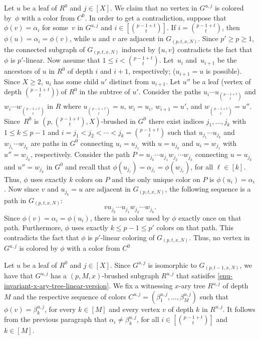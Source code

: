 \documentclass[11pt]{article}
\begin{document}
Let $u$ be a leaf of $R^0$ and $j\in [X]$.  We claim that no vertex in
$G^{u,j}$ is colored by~$\phi$ with a color from $C^0$. In order to get a
contradiction, suppose that $\phi(v) =\alpha_i$ for some~$v$ in $G^{u,j}$ and
$i\in\left[\binom{p-1+t}{t}\right]$.  If $i=\binom{p-1+t}{t}$, then
$\phi(u) = \alpha_i = \phi(v)$, while $u$ and $v$ are adjacent in
$G_{(p,t,x,N)}$.  Since $p'\geq p\geq1$, the connected subgraph of
$G_{(p,t,x,N)}$ induced by $\{u,v\}$ contradicts the fact that $\phi$ is
$p'$-linear.  Now assume that $1\leq i< \binom{p-1+t}{t}$.  Let~$u_i$
and~$u_{i+1}$ be the ancestors of $u$ in $R^0$ of depth $i$ and $i+1$,
respectively; ($u_{i+1} = u$ is possible).  Since $X\geq2$, $u_i$ has some
child $u'$ distinct from $u_{i+1}$.  Let $u''$ be a leaf (vertex of depth
$\binom{p-1+t}{t}$) of $R^0$ in the subtree of $u'$.  Consider the paths
$u_i \cdots u_{\binom{p-1+t}{t}}$ and $w_i \cdots w_{\binom{p-1+t}{t}}$ in
$R$ where $u_{\binom{p-1+t}{t}}=u$, $w_i=u_i$, $w_{i+1}=u'$, and
$w_{\binom{p-1+t}{t}}=u''$.  Since~$R^0$ is
$\left(p,\binom{p-1+t}{t},X\right)$-brushed in $G^0$ there exist indices
$j_1,\ldots,j_k$ with $1\leq k \leq p-1$ and
$i=j_1 < j_2 < \cdots < j_k=\binom{p-1+t}{t}$ such that
$u_{j_1}\cdots u_{j_k}$ and $w_{j_1}\cdots w_{j_k}$ are paths in $G^0$
connecting $u_i = u_{j_1}$ with $u = u_{j_k}$ and $u_i = w_{j_1}$ with
$u'' = w_{j_k}$, respectively.  Consider the path
$P = u_{j_k} \cdots u_{j_1} w_{j_2} \cdots w_{j_k}$ connecting $u=u_{j_k}$ and
$u''=w_{j_k}$ in $G^0$ and recall that
$\phi(u_{j_{\ell}}) = \alpha_{j_{\ell}} =\phi(w_{j_{\ell}})$, for all
$\ell\in[k]$.  Thus, $\phi$ uses exactly $k$ colors on $P$ and the only unique
color on $P$ is $\phi(u_i) = \alpha_i$.  Now since $v$ and $u_{j_k}=u$ are
adjacent in $G_{(p,t,x,N)}$, the following sequence is a path in
$G_{(p,t,x,N)}$:
\[
v u_{j_k} \cdots u_{j_1} w_{j_2} \cdots w_{j_k}.
\]
Since $\phi(v) =\alpha_i = \phi(u_i)$, there is no color used by $\phi$ exactly once on that path. 
Furthermore, $\phi$ uses exactly $k \leq p-1 \leq p'$ colors on that path. 
This contradicts the fact that $\phi$ is $p'$-linear coloring of $G_{(p,t,x,N)}$.
Thus, no vertex in $G^{u,j}$ is colored by $\phi$ with a color from $C^0$

Let $u$ be a leaf of $R^0$ and $j\in [X]$. 
Since $G^{u,j}$ is isomorphic to $G_{(p,t-1,x,N)}$, we have that
$G^{u,j}$ has a $\left(p,M,x\right)$-brushed subgraph $R^{u,j}$ that satisifes \eqref{enu-invariant-x-ary-tree-linear-version}.
We fix a witnessing $x$-ary tree $R^{u,j}$ of depth $M$ and the respective sequence of colors $C^{u,j}=\left(\beta^{u,j}_1,\ldots,\beta^{u,j}_{M}\right)$ such that $\phi(v)=\beta^{u,j}_k$, 
for every $k\in\left[M\right]$ and every vertex $v$ of depth $k$ in $R^{u,j}$.
It follows from the previous paragraph that $\alpha_i \neq \beta^{u,j}_k$, for all $i\in\left[\binom{p-1+t}{t}\right]$ and $k\in\left[M\right]$.
\end{document}
